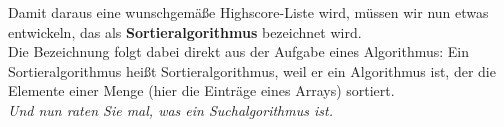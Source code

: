 Damit daraus eine wunschgemäße Highscore-Liste wird, müssen wir nun etwas entwickeln, das als \textbf{Sortieralgorithmus} bezeichnet wird.\\

Die Bezeichnung folgt dabei direkt aus der Aufgabe eines Algorithmus: Ein Sortieralgorithmus heißt Sortieralgorithmus, weil er ein Algorithmus ist, der die Elemente einer Menge (hier die Einträge eines Arrays) sortiert.\\

\emph{Und nun raten Sie mal, was ein Suchalgorithmus ist.}

